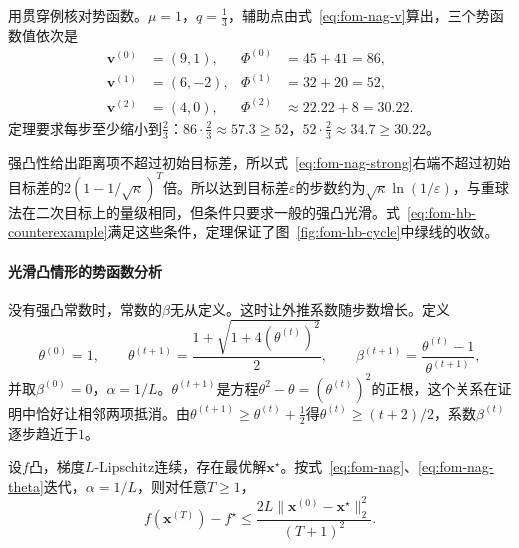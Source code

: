 用贯穿例核对势函数。$\mu=1$，$q=\tfrac13$，辅助点由式~\eqref{eq:fom-nag-v}算出，三个势函数值依次是
\[
 \begin{aligned}
 \bm{v}^{(0)}&=(9,1), &\Phi^{(0)}&=45+41=86,\\
 \bm{v}^{(1)}&=(6,-2), &\Phi^{(1)}&=32+20=52,\\
 \bm{v}^{(2)}&=(4,0), &\Phi^{(2)}&\approx22.22+8=30.22.
 \end{aligned}
\]
定理要求每步至少缩小到$\tfrac23$：$86\cdot\tfrac23\approx57.3\geq52$，$52\cdot\tfrac23\approx34.7\geq30.22$。

强凸性给出距离项不超过初始目标差，所以式~\eqref{eq:fom-nag-strong}右端不超过初始目标差的$2(1-1/\sqrt\kappa)^T$倍。所以达到目标差$\varepsilon$的步数约为$\sqrt\kappa\ln(1/\varepsilon)$，与重球法在二次目标上的量级相同，但条件只要求一般的强凸光滑。式~\eqref{eq:fom-hb-counterexample}满足这些条件，定理保证了图~\ref{fig:fom-hb-cycle}中绿线的收敛。

\paragraph{光滑凸情形的势函数分析}
没有强凸常数时，常数的$\beta$无从定义。这时让外推系数随步数增长。定义
\begin{equation}
 \theta^{(0)}=1,\qquad\theta^{(t+1)}=\frac{1+\sqrt{1+4(\theta^{(t)})^2}}{2},\qquad
 \beta^{(t+1)}=\frac{\theta^{(t)}-1}{\theta^{(t+1)}},
 \label{eq:fom-nag-theta}
\end{equation}
并取$\beta^{(0)}=0$，$\alpha=1/L$。$\theta^{(t+1)}$是方程$\theta^2-\theta=(\theta^{(t)})^2$的正根，这个关系在证明中恰好让相邻两项抵消。由$\theta^{(t+1)}\geq\theta^{(t)}+\tfrac12$得$\theta^{(t)}\geq(t+2)/2$，系数$\beta^{(t)}$逐步趋近于$1$。

\begin{theorem}[光滑凸情形的Nesterov方法]
\label{thm:fom-nag-convex}
设$f$凸，梯度$L$-Lipschitz连续，存在最优解$\bm{x}^\star$。按式~\eqref{eq:fom-nag}、\eqref{eq:fom-nag-theta}迭代，$\alpha=1/L$，则对任意$T\geq1$，
\begin{equation}
 f(\bm{x}^{(T)})-f^\star\leq\frac{2L\lVert\bm{x}^{(0)}-\bm{x}^\star\rVert_2^2}{(T+1)^2}.
 \label{eq:fom-nag-convex}
\end{equation}
\end{theorem}

